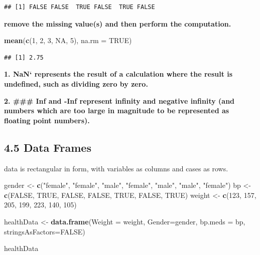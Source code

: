 \documentclass[]{article}
\newenvironment{Shaded}{\begin{snugshade}}{\end{snugshade}}
\newcommand{\KeywordTok}[1]{\textcolor[rgb]{0.13,0.29,0.53}{\textbf{#1}}}
\newcommand{\DataTypeTok}[1]{\textcolor[rgb]{0.13,0.29,0.53}{#1}}
\newcommand{\DecValTok}[1]{\textcolor[rgb]{0.00,0.00,0.81}{#1}}
\newcommand{\StringTok}[1]{\textcolor[rgb]{0.31,0.60,0.02}{#1}}
\newcommand{\OtherTok}[1]{\textcolor[rgb]{0.56,0.35,0.01}{#1}}
\newcommand{\NormalTok}[1]{#1}
\begin{document}
\begin{verbatim}
## [1] FALSE FALSE  TRUE FALSE  TRUE FALSE
\end{verbatim}

\textbf{remove the missing value(s) and then perform the computation.}

\begin{Shaded}
\begin{Highlighting}[]
\KeywordTok{mean}\NormalTok{(}\KeywordTok{c}\NormalTok{(}\DecValTok{1}\NormalTok{, }\DecValTok{2}\NormalTok{, }\DecValTok{3}\NormalTok{, }\OtherTok{NA}\NormalTok{, }\DecValTok{5}\NormalTok{), }\DataTypeTok{na.rm =} \OtherTok{TRUE}\NormalTok{)}
\end{Highlighting}
\end{Shaded}

\begin{verbatim}
## [1] 2.75
\end{verbatim}

\textbf{1. NaN` represents the result of a calculation where the result
is undefined, such as dividing zero by zero.}

\textbf{2. \#\#\# Inf and -Inf represent infinity and negative infinity
(and numbers which are too large in magnitude to be represented as
floating point numbers).}

\subsection{4.5 Data Frames}\label{data-frames}

data is rectangular in form, with variables as columns and cases as
rows.

\begin{Shaded}
\begin{Highlighting}[]
\NormalTok{gender <-}\StringTok{ }\KeywordTok{c}\NormalTok{(}\StringTok{"female"}\NormalTok{, }\StringTok{"female"}\NormalTok{, }\StringTok{"male"}\NormalTok{, }\StringTok{"female"}\NormalTok{, }\StringTok{"male"}\NormalTok{, }\StringTok{"male"}\NormalTok{, }\StringTok{"female"}\NormalTok{)}
\NormalTok{bp <-}\StringTok{ }\KeywordTok{c}\NormalTok{(}\OtherTok{FALSE}\NormalTok{, }\OtherTok{TRUE}\NormalTok{, }\OtherTok{FALSE}\NormalTok{, }\OtherTok{FALSE}\NormalTok{, }\OtherTok{TRUE}\NormalTok{, }\OtherTok{FALSE}\NormalTok{, }\OtherTok{TRUE}\NormalTok{)}
\NormalTok{weight <-}\StringTok{ }\KeywordTok{c}\NormalTok{(}\DecValTok{123}\NormalTok{, }\DecValTok{157}\NormalTok{, }\DecValTok{205}\NormalTok{, }\DecValTok{199}\NormalTok{, }\DecValTok{223}\NormalTok{, }\DecValTok{140}\NormalTok{, }\DecValTok{105}\NormalTok{)}

\NormalTok{healthData <-}\StringTok{ }\KeywordTok{data.frame}\NormalTok{(}\DataTypeTok{Weight =}\NormalTok{ weight, }\DataTypeTok{Gender=}\NormalTok{gender, }\DataTypeTok{bp.meds =}\NormalTok{ bp,  }\DataTypeTok{stringsAsFactors=}\OtherTok{FALSE}\NormalTok{)}

\NormalTok{healthData}
\end{Highlighting}
\end{Shaded}
\end{document}
